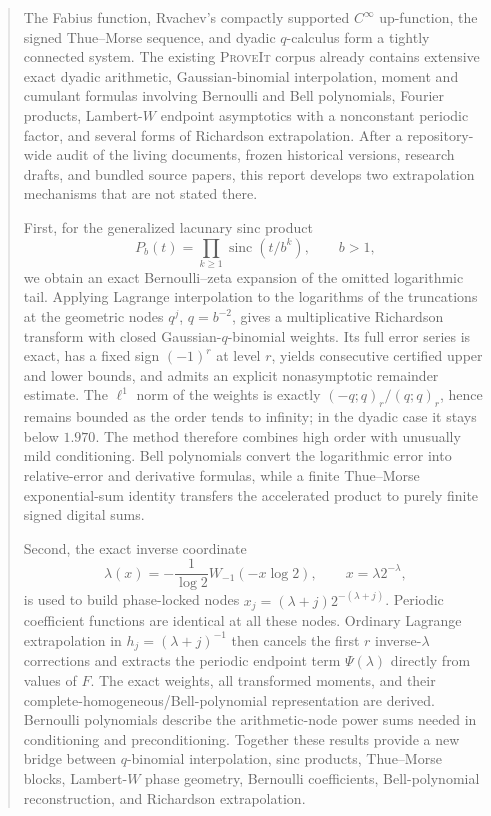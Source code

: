 \documentclass[11pt]{article}
\theoremstyle{definition}
\theoremstyle{remark}
\newcommand{\sinc}{\operatorname{sinc}}
\newcommand{\repo}{\textsc{ProveIt}}
\begin{document}
\begin{abstract}
The Fabius function, Rvachev's compactly supported $C^\infty$ up-function, the signed Thue--Morse sequence, and dyadic $q$-calculus form a tightly connected system. The existing \repo{} corpus already contains extensive exact dyadic arithmetic, Gaussian-binomial interpolation, moment and cumulant formulas involving Bernoulli and Bell polynomials, Fourier products, Lambert-$W$ endpoint asymptotics with a nonconstant periodic factor, and several forms of Richardson extrapolation. After a repository-wide audit of the living documents, frozen historical versions, research drafts, and bundled source papers, this report develops two extrapolation mechanisms that are not stated there.

First, for the generalized lacunary sinc product
\[
P_b(t)=\prod_{k\ge 1}\sinc(t/b^k),\qquad b>1,
\]
we obtain an exact Bernoulli--zeta expansion of the omitted logarithmic tail. Applying Lagrange interpolation to the logarithms of the truncations at the geometric nodes $q^j$, $q=b^{-2}$, gives a multiplicative Richardson transform with closed Gaussian-$q$-binomial weights. Its full error series is exact, has a fixed sign $(-1)^r$ at level $r$, yields consecutive certified upper and lower bounds, and admits an explicit nonasymptotic remainder estimate. The $\ell^1$ norm of the weights is exactly $(-q;q)_r/(q;q)_r$, hence remains bounded as the order tends to infinity; in the dyadic case it stays below $1.970$. The method therefore combines high order with unusually mild conditioning. Bell polynomials convert the logarithmic error into relative-error and derivative formulas, while a finite Thue--Morse exponential-sum identity transfers the accelerated product to purely finite signed digital sums.

Second, the exact inverse coordinate
\[
\lambda(x)=-\frac{1}{\log 2}W_{-1}(-x\log 2),\qquad x=\lambda 2^{-\lambda},
\]
is used to build phase-locked nodes $x_j=(\lambda+j)2^{-(\lambda+j)}$. Periodic coefficient functions are identical at all these nodes. Ordinary Lagrange extrapolation in $h_j=(\lambda+j)^{-1}$ then cancels the first $r$ inverse-$\lambda$ corrections and extracts the periodic endpoint term $\Psi(\lambda)$ directly from values of $F$. The exact weights, all transformed moments, and their complete-homogeneous/Bell-polynomial representation are derived. Bernoulli polynomials describe the arithmetic-node power sums needed in conditioning and preconditioning. Together these results provide a new bridge between $q$-binomial interpolation, sinc products, Thue--Morse blocks, Lambert-$W$ phase geometry, Bernoulli coefficients, Bell-polynomial reconstruction, and Richardson extrapolation.
\end{abstract}
\end{document}
